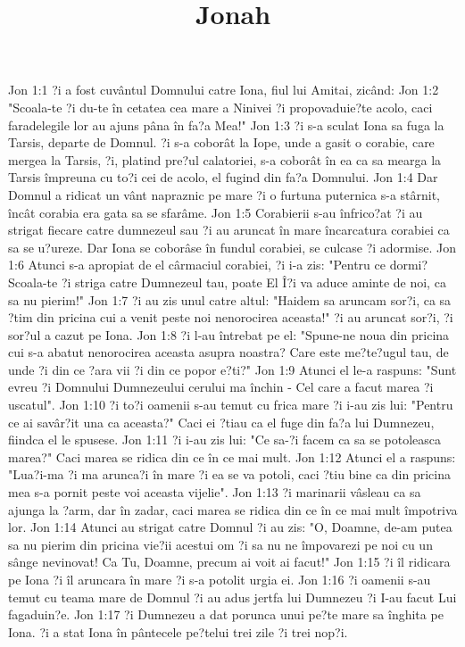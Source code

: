 

\title{Jonah}

Jon 1:1  ?i a fost cuvântul Domnului catre Iona, fiul lui Amitai, zicând:
Jon 1:2  "Scoala-te ?i du-te în cetatea cea mare a Ninivei ?i propovaduie?te acolo, caci faradelegile lor au ajuns pâna în fa?a Mea!"
Jon 1:3  ?i s-a sculat Iona sa fuga la Tarsis, departe de Domnul. ?i s-a coborât la Iope, unde a gasit o corabie, care mergea la Tarsis, ?i, platind pre?ul calatoriei, s-a coborât în ea ca sa mearga la Tarsis împreuna cu to?i cei de acolo, el fugind din fa?a Domnului.
Jon 1:4  Dar Domnul a ridicat un vânt napraznic pe mare ?i o furtuna puternica s-a stârnit, încât corabia era gata sa se sfarâme.
Jon 1:5  Corabierii s-au înfrico?at ?i au strigat fiecare catre dumnezeul sau ?i au aruncat în mare încarcatura corabiei ca sa se u?ureze. Dar Iona se coborâse în fundul corabiei, se culcase ?i adormise.
Jon 1:6  Atunci s-a apropiat de el cârmaciul corabiei, ?i i-a zis: "Pentru ce dormi? Scoala-te ?i striga catre Dumnezeul tau, poate El Î?i va aduce aminte de noi, ca sa nu pierim!"
Jon 1:7  ?i au zis unul catre altul: "Haidem sa aruncam sor?i, ca sa ?tim din pricina cui a venit peste noi nenorocirea aceasta!" ?i au aruncat sor?i, ?i sor?ul a cazut pe Iona.
Jon 1:8  ?i l-au întrebat pe el: "Spune-ne noua din pricina cui s-a abatut nenorocirea aceasta asupra noastra? Care este me?te?ugul tau, de unde ?i din ce ?ara vii ?i din ce popor e?ti?"
Jon 1:9  Atunci el le-a raspuns: "Sunt evreu ?i Domnului Dumnezeului cerului ma închin - Cel care a facut marea ?i uscatul".
Jon 1:10  ?i to?i oamenii s-au temut cu frica mare ?i i-au zis lui: "Pentru ce ai savâr?it una ca aceasta?" Caci ei ?tiau ca el fuge din fa?a lui Dumnezeu, fiindca el le spusese.
Jon 1:11  ?i i-au zis lui: "Ce sa-?i facem ca sa se potoleasca marea?" Caci marea se ridica din ce în ce mai mult.
Jon 1:12  Atunci el a raspuns: "Lua?i-ma ?i ma arunca?i în mare ?i ea se va potoli, caci ?tiu bine ca din pricina mea s-a pornit peste voi aceasta vijelie".
Jon 1:13  ?i marinarii vâsleau ca sa ajunga la ?arm, dar în zadar, caci marea se ridica din ce în ce mai mult împotriva lor.
Jon 1:14  Atunci au strigat catre Domnul ?i au zis: "O, Doamne, de-am putea sa nu pierim din pricina vie?ii acestui om ?i sa nu ne împovarezi pe noi cu un sânge nevinovat! Ca Tu, Doamne, precum ai voit ai facut!"
Jon 1:15  ?i îl ridicara pe Iona ?i îl aruncara în mare ?i s-a potolit urgia ei.
Jon 1:16  ?i oamenii s-au temut cu teama mare de Domnul ?i au adus jertfa lui Dumnezeu ?i I-au facut Lui fagaduin?e.
Jon 1:17  ?i Dumnezeu a dat porunca unui pe?te mare sa înghita pe Iona. ?i a stat Iona în pântecele pe?telui trei zile ?i trei nop?i.
